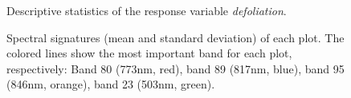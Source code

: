 \documentclass[review]{elsarticle}
\begin{document}
\begin{figure} [t!]
	\begin{center}
		\caption{Descriptive statistics of the response variable \textit{defoliation}.}
		\label{fig:defol_boxplots}
	\end{center}
\end{figure}

\begin{figure} [t!]
	\begin{center}
		\caption{Spectral signatures (mean and standard deviation) of each plot.
			The colored lines show the most important band for each plot, respectively: Band 80 (773nm, red), band 89 (817nm, blue), band 95 (846nm, orange), band 23 (503nm, green).}
		\label{fig:spectral_signatures}
	\end{center}
\end{figure}
\end{document}
